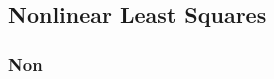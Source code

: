 % 

%
\subsection{Nonlinear Least Squares}

\begin{frame}\frametitle{Non}
\end{frame}
%

\endinput  %
